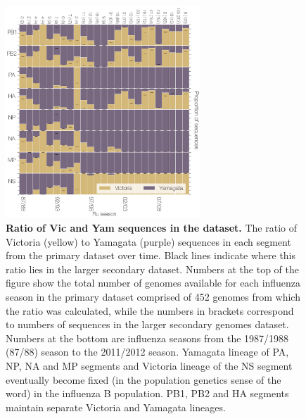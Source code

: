 \documentclass[11pt,oneside,letterpaper]{article}
\begin{document}
\begin{figure}[h]
	\centering	
	\includegraphics[width=0.65\textwidth]	{figures/InfB_LineageRatiosOverTime.png}
	\caption{\textbf{Ratio of Vic and Yam sequences in the dataset.}
The ratio of Victoria (yellow) to Yamagata (purple) sequences in each segment from the primary dataset over time.
Black lines indicate where this ratio lies in the larger secondary dataset.
Numbers at the top of the figure show the total number of genomes available for each influenza season in the primary dataset comprised of 452 genomes from which the ratio was calculated, while the numbers in brackets correspond to numbers of sequences in the larger secondary genomes dataset.
Numbers at the bottom are influenza seasons from the 1987/1988 (87/88) season to the 2011/2012 season.
Yamagata lineage of PA, NP, NA and MP segments and Victoria lineage of the NS segment eventually become fixed (in the population genetics sense of the word) in the influenza B population.
PB1, PB2 and HA segments maintain separate Victoria and Yamagata lineages.}
	\label{lineageRatiosOverTime}
\end{figure}
\end{document}

